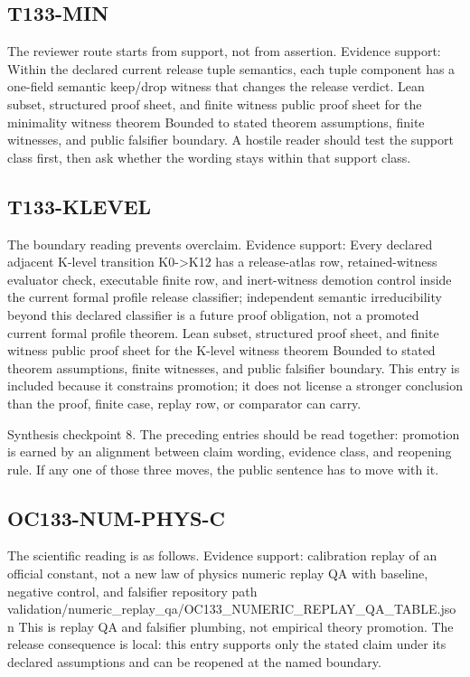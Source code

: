 \subsection{T133-MIN}
The reviewer route starts from support, not from assertion. Evidence support: Within the declared current release tuple semantics, each tuple component has a one-field semantic keep/drop witness that changes the release verdict. Lean subset, structured proof sheet, and finite witness public proof sheet for the minimality witness theorem Bounded to stated theorem assumptions, finite witnesses, and public falsifier boundary. A hostile reader should test the support class first, then ask whether the wording stays within that support class.

\subsection{T133-KLEVEL}
The boundary reading prevents overclaim. Evidence support: Every declared adjacent K-level transition K0-\textgreater{}K12 has a release-atlas row, retained-witness evaluator check, executable finite row, and inert-witness demotion control inside the current formal profile release classifier; independent semantic irreducibility beyond this declared classifier is a future proof obligation, not a promoted current formal profile theorem. Lean subset, structured proof sheet, and finite witness public proof sheet for the K-level witness theorem Bounded to stated theorem assumptions, finite witnesses, and public falsifier boundary. This entry is included because it constrains promotion; it does not license a stronger conclusion than the proof, finite case, replay row, or comparator can carry.

Synthesis checkpoint 8. The preceding entries should be read together: promotion is earned by an alignment between claim wording, evidence class, and reopening rule. If any one of those three moves, the public sentence has to move with it.

\subsection{OC133-NUM-PHYS-C}
The scientific reading is as follows. Evidence support: calibration replay of an official constant, not a new law of physics numeric replay QA with baseline, negative control, and falsifier repository path validation/numeric\_replay\_qa/OC133\_NUMERIC\_REPLAY\_QA\_TABLE.json This is replay QA and falsifier plumbing, not empirical theory promotion. The release consequence is local: this entry supports only the stated claim under its declared assumptions and can be reopened at the named boundary.

